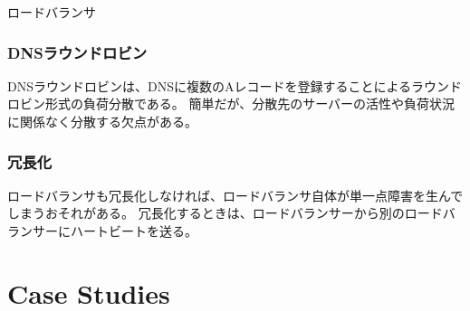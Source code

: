 \documentclass[book]{jlreq}
\begin{document}
\begin{chapter-bib}{ロードバランサ}
  \section{DNSラウンドロビン}
  DNSラウンドロビンは、DNSに複数のAレコードを登録することによるラウンドロビン形式の負荷分散である。
  簡単だが、分散先のサーバーの活性や負荷状況に関係なく分散する欠点がある\cite{cs75}。
  \section{冗長化}
  ロードバランサも冗長化しなければ、ロードバランサ自体が単一点障害を生んでしまうおそれがある。
  冗長化するときは、ロードバランサーから別のロードバランサーにハートビートを送る\cite{cs75}。
\end{chapter-bib}
\part{Case Studies}
\end{document}
